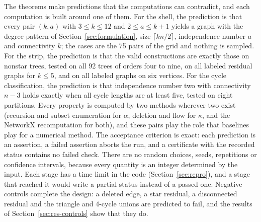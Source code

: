 The theorems make predictions that the computations can contradict, and each computation is built around one of them.
For the shell, the prediction is that every pair $(k,a)$ with $3\le k\le12$ and $2\le a\le k+1$ yields a graph with the degree pattern of Section~\ref{sec:formulation}, size $\lceil kn/2\rceil$, independence number $a$ and connectivity $k$; the cases are the 75 pairs of the grid and nothing is sampled.
For the strip, the prediction is that the valid constructions are exactly those on nonstar trees, tested on all 92 trees of orders four to nine, on all labeled residual graphs for $k\le5$, and on all labeled graphs on six vertices.
For the cycle classification, the prediction is that independence number two with connectivity $n-3$ holds exactly when all cycle lengths are at least five, tested on eight partitions.
Every property is computed by two methods wherever two exist (recursion and subset enumeration for $\alpha$, deletion and flow for $\kappa$, and the NetworkX recomputation for both), and these pairs play the role that baselines play for a numerical method.
The acceptance criterion is exact: each prediction is an assertion, a failed assertion aborts the run, and a certificate with the recorded status contains no failed check.
There are no random choices, seeds, repetitions or confidence intervals, because every quantity is an integer determined by the input.
Each stage has a time limit in the code (Section~\ref{sec:repro}), and a stage that reached it would write a partial status instead of a passed one.
Negative controls complete the design: a deleted edge, a star residual, a disconnected residual and the triangle and $4$-cycle unions are predicted to fail, and the results of Section~\ref{sec:res-controls} show that they do.
